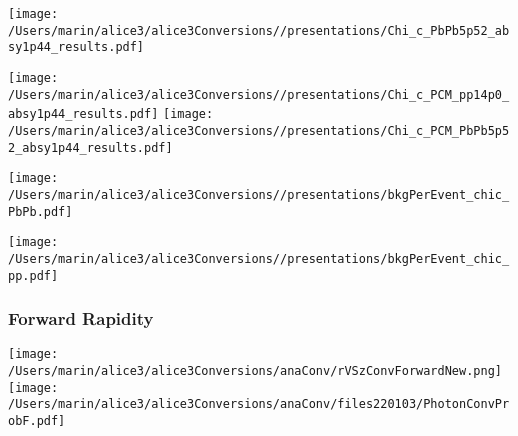 \documentclass[final,hyperref={pdfpagelabels=false},aspectratio=169,t]{beamer}
\begin{document}

\begin{frame}

\texttt{[image: /Users/marin/alice3/alice3Conversions//presentations/Chi\_c\_PbPb5p52\_absy1p44\_results.pdf]}

\texttt{[image: /Users/marin/alice3/alice3Conversions//presentations/Chi\_c\_PCM\_pp14p0\_absy1p44\_results.pdf]}
\texttt{[image: /Users/marin/alice3/alice3Conversions//presentations/Chi\_c\_PCM\_PbPb5p52\_absy1p44\_results.pdf]}
\end{frame}


\begin{frame}
\texttt{[image: /Users/marin/alice3/alice3Conversions//presentations/bkgPerEvent\_chic\_PbPb.pdf]}

 \texttt{[image: /Users/marin/alice3/alice3Conversions//presentations/bkgPerEvent\_chic\_pp.pdf]}

\end{frame}


\begin{frame}
\frametitle{Forward Rapidity} 


\texttt{[image: /Users/marin/alice3/alice3Conversions/anaConv/rVSzConvForwardNew.png]}
\texttt{[image: /Users/marin/alice3/alice3Conversions/anaConv/files220103/PhotonConvProbF.pdf]}

\end{frame}
\end{document}
